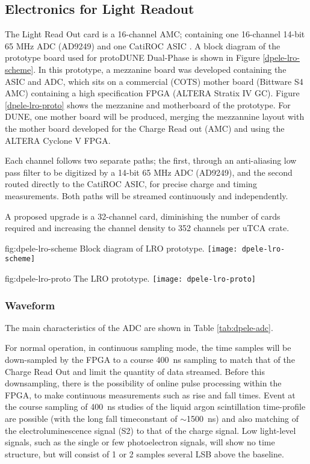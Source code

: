 \subsection{Electronics for Light Readout}
\label{sec:fddp-tpc-elec-design-lro}

%
The Light Read Out card is a 16-channel AMC; containing one 16-channel 14-bit 65 MHz ADC (AD9249) and one CatiROC ASIC \cite{catiroc}. A block diagram of the prototype board used for protoDUNE Dual-Phase is shown in Figure \ref{dpele-lro-scheme}. In this prototype, a mezzanine board was developed containing the ASIC and ADC, which sits on a commercial (COTS) mother board (Bittware S4 AMC) containing a high specification FPGA (ALTERA Stratix IV GC). Figure \ref{dpele-lro-proto} shows the mezzanine and motherboard of the prototype.   For DUNE, one mother board will be produced, merging the mezzannine layout with the mother board developed for the Charge Read out (AMC) and using the ALTERA Cyclone V FPGA. 

Each channel follows two separate paths; the first, through an anti-aliasing low pass filter to be digitized by a 14-bit 65 MHz ADC (AD9249), and the second routed directly to the CatiROC ASIC, for precise charge and timing measurements. Both paths will be streamed continuously and independently.

A proposed upgrade is a 32-channel card, diminishing the number of cards required and increasing the channel density to 352 channels per uTCA crate.

\begin{dunefigure}{fig:dpele-lro-scheme}
{Block diagram of LRO prototype.}
\texttt{[image: dpele-lro-scheme]}
\end{dunefigure}

\begin{dunefigure}{fig:dpele-lro-proto}
{The LRO prototype.}
\texttt{[image: dpele-lro-proto]}
\end{dunefigure}

\subsubsection{Waveform} %
The main characteristics of the ADC are shown in Table \ref{tab:dpele-adc}.

For normal operation, in continuous sampling mode, the time samples will be down-sampled by the FPGA to a course \SI{400}{ns} sampling to match that of the Charge Read Out and limit the quantity of data streamed. Before this downsampling, there is the possibility of online pulse processing within the FPGA, to make continuous measurements such as rise and fall times. Event at the course sampling of \SI{400}{ns} studies of the liquid argon scintillation time-profile are possible (with the long fall timeconstant of $\sim$\SI{1500}{ns}) and also matching of the electroluminescence signal (S2) to that of the charge signal.  Low light-level signals, such as the single or few photoelectron signals, will show no time structure, but will consist of 1 or 2 samples several LSB above the baseline.

